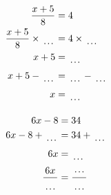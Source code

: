 \documentclass[12pt]{article}
\newcounter{minipagecount}
\begin{document}
\begin{multicols}{2}
\begin{minipage}[t]{0.45\textwidth}
    \raggedright %
    \begin{align*} %
        \frac{x + 5}{8} &= 4\\
        \frac{x + 5}{8} \times\dotuline{\hspace{5mm}} &= 4 \times\dotuline{\hspace{5mm}}\\
        x + 5 &= \dotuline{\hspace{5mm}}\\
        x + 5 - \dotuline{\hspace{5mm}} &= \dotuline{\hspace{5mm}} - \dotuline{\hspace{5mm}}\\
        x &= \dotuline{\hspace{5mm}}\\
    \end{align*}
\end{minipage} %
\noindent{(\theminipagecount)}\hspace{0.1mm} %
\begin{minipage}[t]{0.45\textwidth} %
    \vspace{-26pt}  %
    \raggedright %
    \begin{align*} %
        6x - 8 &= 34\\
        6x - 8 + \dotuline{\hspace{5mm}} &= 34 + \dotuline{\hspace{5mm}}\\
        6x &= \dotuline{\hspace{5mm}}\\
        \frac{6x}{\dotuline{\hspace{5mm}}} &= \frac{\dotuline{\hspace{5mm}}}{\dotuline{\hspace{5mm}}}\\

\end{align*}
\end{minipage}
\end{multicols}
\end{document}
